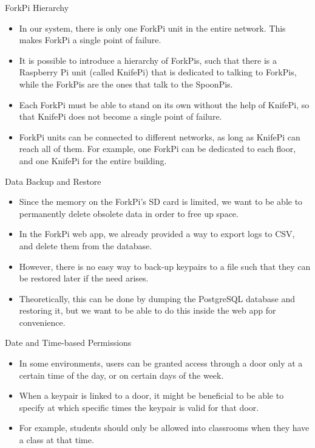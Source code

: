 \begin{frame}{ForkPi Hierarchy}
\begin{itemize}
    \item<1-> In our system, there is only one ForkPi unit in the entire network. This makes ForkPi a single point of failure. %
    \item<2-> It is possible to introduce a hierarchy of ForkPis, such that there is a Raspberry Pi unit (called KnifePi) that is dedicated to talking to ForkPis, while the ForkPis are the ones that talk to the SpoonPis.
    \item<3-> Each ForkPi must be able to stand on its own without the help of KnifePi, so that KnifePi does not become a single point of failure.
    \item<4-> ForkPi units can be connected to different networks, as long as KnifePi can reach all of them. For example, one ForkPi can be dedicated to each floor, and one KnifePi for the entire building.
\end{itemize}
\end{frame}

\begin{frame}{Data Backup and Restore}
\begin{itemize}
    \item<1-> Since the memory on the ForkPi's SD card is limited, we want to be able to permanently delete obsolete data in order to free up space.
    \item<2-> In the ForkPi web app, we already provided a way to export logs to CSV, and delete them from the database.
    \item<3-> However, there is no easy way to back-up keypairs to a file such that they can be restored later if the need arises. 
    \item<4-> Theoretically, this can be done by dumping the PostgreSQL database and restoring it, but we want to be able to do this inside the web app for convenience.
\end{itemize}
\end{frame}

\begin{frame}{Date and Time-based Permissions}
\begin{itemize}
    \item<1-> In some environments, users can be granted access through a door only at a certain time of the day, or on certain days of the week.
    \item<2-> When a keypair is linked to a door, it might be beneficial to be able to specify at which specific times the keypair is valid for that door.
    \item<3-> For example, students should only be allowed into classrooms when they have a class at that time.
\end{itemize}
\end{frame}

